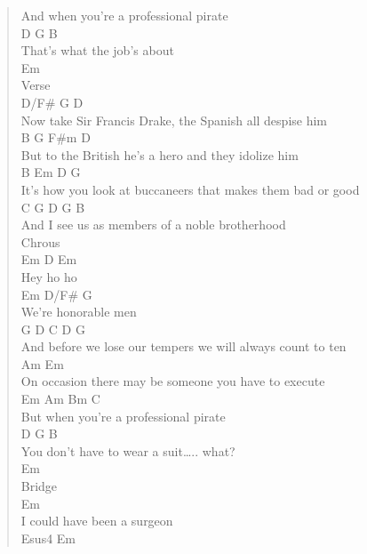 \documentclass[11pt]{article}
\begin{document}
\begin{verse}
And when you're a professional pirate\\
\hspace*{8em}D               G     B\\
That's what the job's about\\
\vspace*{1em}
Em\\
\vspace*{1em}
Verse\\
D/F\# G                                          D\\
Now take Sir Francis Drake, the Spanish all despise him\\
B            G                 F\#m         D\\
But to the British he's a hero and they idolize him\\
B                   Em               D         G\\
It's how you look at buccaneers that makes them bad or good\\
C               G             D      G         B\\
And I see us as members of a noble brotherhood\\
\vspace*{1em}
Chrous\\
Em  D Em\\
Hey ho ho\\
Em     D/F\#    G\\
We're honorable men\\
G                      D               C       D         G\\
And before we lose our tempers we will always count to ten\\
Am                               Em\\
On occasion there may be someone you have to execute\\
Em  Am   Bm       C\\
But when you're a professional pirate\\
D                        G              B\\
You don't have to wear a suit\ldots{}.. what?\\
\vspace*{1em}
Em\\
\vspace*{1em}
Bridge\\
Em\\
I could have been a surgeon\\
Esus4           Em\\

\end{verse}
\end{document}
